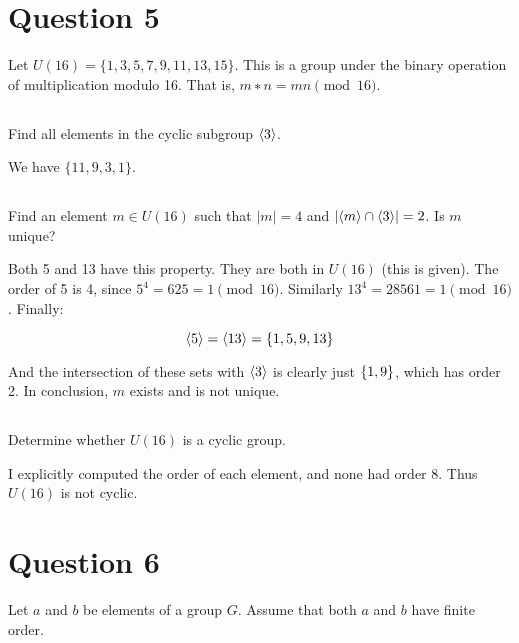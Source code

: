 \documentclass[a4paper,12pt]{article}
\DeclarePairedDelimiter{\set}{\lbrace}{\rbrace}
\DeclarePairedDelimiter{\gen}{\langle}{\rangle}
\begin{document}
\section{Question 5}
Let $U (16) = \{ 1, 3, 5, 7, 9, 11, 13, 15 \}$. This is a group under the binary operation
of multiplication modulo 16. That is, $m ∗ n = mn \pmod{16}$.

\subsection{}
Find all elements in the cyclic subgroup $\gen{3}$. 

We have $\{ 11, 9, 3, 1 \}$.

\subsection{}

Find an element $m \in U (16)$ such that $|m| = 4$ and $| \gen{m} \cap \gen{3} | = 2$. Is $m$ unique?

Both 5 and 13 have this property. They are both in $U(16)$ (this is given). The order of 5 is 4, since $5^4 = 625 = 1 \pmod{16}$. Similarly $13^4 = 28561 = 1 \pmod{16}$. Finally:

\begin{equation}
\gen{5} = \gen{13} = \set{1, 5, 9, 13}
\end{equation}

And the intersection of these sets with $\gen{3}$ is clearly just $\set{1, 9}$, which has order 2. In conclusion, $m$ exists and is not unique.

\subsection{}

Determine whether $U (16)$ is a cyclic group. 

I explicitly computed the order of each element, and none had order 8. Thus $U(16)$ is not cyclic.

\section{Question 6}
Let $a$ and $b$ be elements of a group $G$. Assume that both $a$ and $b$ have finite order.

\subsection{}
\end{document}
